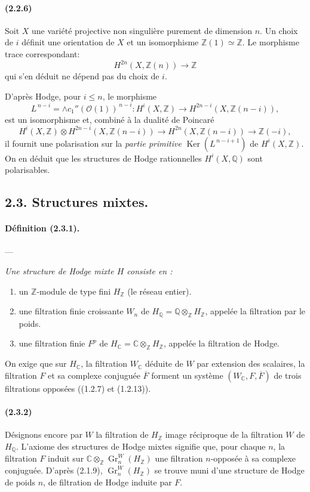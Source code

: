 \documentclass[10pt]{article}
\newcommand{\C}{\mathbb C}
\newcommand{\Q}{\mathbb Q}
\newcommand{\Z}{\mathbb Z}
\newcommand{\Gr}{\operatorname{Gr}}
\newcommand{\Ker}{\operatorname{Ker}}
\newcommand{\fg}{\guillemotright}
\newcommand{\og}{\guillemotleft}
\providecommand{\cO}{\mathcal O}
\providecommand{\cO}{\mathcal O}
\begin{document}
\paragraph{(2.2.6)} Soit $X$ une variété projective non singulière purement de dimension $n$. Un choix de $i$ définit une orientation de $X$ et un isomorphisme $\Z(1)\simeq\Z$. Le morphisme trace correspondant:
\[
H^{2n}(X,\Z(n))\longrightarrow \Z
\]
qui s'en déduit ne dépend pas du choix de $i$.

D'après Hodge, pour $i\le n$, le morphisme
\[
L^{\,n-i}=\wedge c_1''(\cO(1))^{\,n-i}:H^i(X,\Z)\longrightarrow H^{2n-i}(X,\Z(n-i)),
\]
est un isomorphisme et, combiné à la dualité de Poincaré
\[
H^i(X,\Z)\otimes H^{2n-i}(X,\Z(n-i))\longrightarrow
H^{2n}(X,\Z(n-i))\longrightarrow \Z(-i),
\]
il fournit une polarisation sur la \emph{partie primitive} $\Ker(L^{\,n-i+1})$ de $H^i(X,\Z)$. On en déduit que les structures de Hodge rationnelles $H^i(X,\Q)$ sont polarisables.

\subsection*{2.3. Structures mixtes.}

\paragraph{Définition (2.3.1).} --- {\itshape Une structure de Hodge mixte $H$ consiste en :
\begin{enumerate}[label=\alph*)]
\item un $\Z$-module de type fini $H_\Z$ (le \og réseau entier\fg{}).
\item une filtration finie croissante $W_n$ de $H_\Q=\Q\otimes_\Z H_\Z$, appelée la filtration par le poids.
\item une filtration finie $F^p$ de $H_\C=\C\otimes_\Z H_\Z$, appelée la filtration de Hodge.
\end{enumerate}
On exige que sur $H_\C$, la filtration $W_\C$ déduite de $W$ par extension des scalaires, la filtration $F$ et sa complexe conjuguée $\overline F$ forment un système $(W_\C,F,\overline F)$ de trois filtrations opposées ((1.2.7) et (1.2.13)).}

\paragraph{(2.3.2)} Désignons encore par $W$ la filtration de $H_\Z$ image réciproque de la filtration $W$ de $H_\Q$. L'axiome des structures de Hodge mixtes signifie que, pour chaque $n$, la filtration $F$ induit sur $\C\otimes_\Z\Gr_n^W(H_\Z)$ une filtration $n$-opposée à sa complexe conjuguée. D'après (2.1.9), $\Gr_n^W(H_\Z)$ se trouve muni d'une structure de Hodge de poids $n$, de filtration de Hodge induite par $F$.
\end{document}

